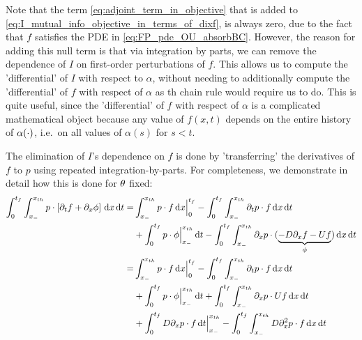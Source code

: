 \documentclass{article}
\begin{document}
Note that the term \cref{eq:adjoint_term_in_objective} that is added to
\cref{eq:I_mutual_info_objective_in_terms_of_dixf}, is always zero, due to the
fact that $f$ satisfies the PDE in \cref{eq:FP_pde_OU_absorbBC}. However, the
reason for adding this null term is that via integration by parts, we can
remove the dependence of $I$ on first-order perturbations of $f$. This allows us to
compute the 'differential' of $I$ with respect to $\alpha$, without needing to
additionally compute the 'differential' of $f$ with respect of $\alpha$ as th
chain rule would require us to do. This is quite useful, since the
'differential' of $f$ with respect of $\alpha$ is a complicated mathematical
object because any value of $f(x,t)$ depends on the entire history of
${\alpha}(\cdot)$, i.e.\ on all values of $\alpha(s)$ for $s<t$.

The elimination of $I$'s dependence on $f$ is done by 'transferring' the
derivatives of $f$ to $p$ using repeated integration-by-parts. For completeness,
we demonstrate in detail how this is done for ${\theta}$ fixed:
\begin{align*}
\int_0^{{t_f}} \int_{x_-}^{{ x_{th} }}
p \cdot \left[{\partial}_t f  + {\partial}_x \phi\right]
	\, \mathrm{d} x\, \mathrm{d} t 
=& 
\int_{x_-}^{{ x_{th} }} p \cdot f \, \mathrm{d} x \Big|_0^{{t_f}} -
\int_0^{{t_f}}\int_{x_-}^{{ x_{th} }} {\partial}_tp \cdot  f \, \mathrm{d} x\, \mathrm{d} t  
\\
&+ \int_{0}^{{t_f}} p\cdot \phi   \Big|_{x_-}^{{ x_{th} }} \, \mathrm{d} t
-  \int_0^{{t_f}}\int_{x_-}^{{ x_{th} }} {\partial}_xp \cdot  (\underbrace{-D{\partial}_xf - U
f}_{\phi})
\, \mathrm{d} x\, \mathrm{d} t
\\
=&
\int_{x_-}^{{ x_{th} }} p \cdot f \, \mathrm{d} x \Big|_0^{{t_f}} -
\int_0^{{t_f}}\int_{x_-}^{{ x_{th} }} {\partial}_tp \cdot  f \, \mathrm{d} x\, \mathrm{d} t  
\\ 
&+ \int_{0}^{{t_f}} p\cdot \phi \Big|_{x_-}^{{ x_{th} }} \, \mathrm{d} t 
 + \int_0^{{t_f}}\int_{x_-}^{{ x_{th} }} {\partial}_xp \cdot  U f\, \mathrm{d} x\, \mathrm{d} t
\\
&+  
\int_{0}^{{t_f}} D{\partial}_xp\cdot f \, \mathrm{d} t  \Big|_{x_-}^{{ x_{th} }} -
\int_0^{{t_f}}\int_{x_-}^{{ x_{th} }} D{\partial}^2_xp \cdot  f\, \mathrm{d} x\, \mathrm{d} t
\end{align*}
\end{document}
